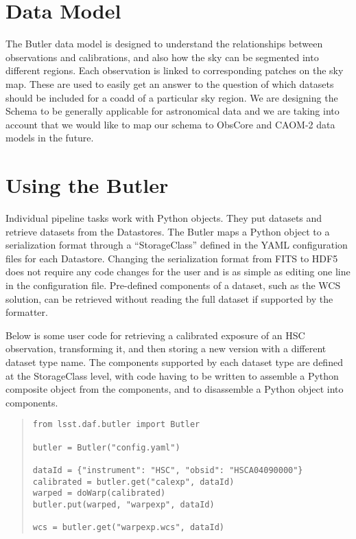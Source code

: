 \documentclass[11pt,twoside]{article}
\begin{document}

\section{Data Model}

The Butler data model is designed to understand the relationships between observations and calibrations, and also how the sky can be segmented into different regions.
Each observation is linked to corresponding patches on the sky map.
These are used to easily get an answer to the question of which datasets should be included for a coadd of a particular sky region.
We are designing the Schema to be generally applicable for astronomical data and we are taking into account that we would like to map our schema to ObsCore \citep{2017ivoa.spec.0509L} and CAOM-2 \citep{2012ASPC..461..339D} data models in the future.

\section{Using the Butler}

Individual pipeline tasks work with Python objects.
They put datasets and retrieve datasets from the Datastores.
The Butler maps a Python object  to  a serialization format through a ``StorageClass'' defined in the YAML configuration files for each Datastore.
Changing the serialization format from FITS to HDF5 does not require any code changes for the user and is as simple as editing one line in the configuration file.
Pre-defined components of a dataset, such as the WCS solution, can be retrieved without reading the full dataset if supported by the formatter.

Below is some user code for retrieving a calibrated exposure of an HSC observation, transforming it, and then storing a new version with a different dataset type name.
The components supported by each dataset type are defined at the StorageClass level, with code having to be written to assemble a Python composite object from the components, and to disassemble a Python object into components.

\begin{quote}
\begin{small}
\begin{verbatim}
from lsst.daf.butler import Butler

butler = Butler("config.yaml")

dataId = {"instrument": "HSC", "obsid": "HSCA04090000"}
calibrated = butler.get("calexp", dataId)
warped = doWarp(calibrated)
butler.put(warped, "warpexp", dataId)

wcs = butler.get("warpexp.wcs", dataId)
\end{verbatim}
\end{small}
\end{quote}
\end{document}
